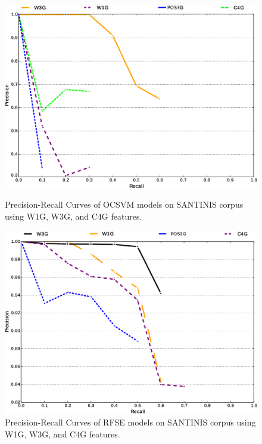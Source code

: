 \begin{figure}[t]
	\begin{center}
    \includegraphics[scale=0.45]{Figures/OCSME_Best_per_DocRep.eps}
	\caption{Precision-Recall Curves of OCSVM models on SANTINIS corpus using W1G, W3G, and C4G features.}
	\label{chap:noise:fig:MacroPRC_OCSVME_W3G_W1G_C4G_OPTIMAL_SANTINIS}
	\end{center}

	\begin{center}
    \includegraphics[scale=0.45]{Figures/RFSE_Best_per_DocRep.eps}
	\caption{Precision-Recall Curves of RFSE models on SANTINIS corpus using W1G, W3G, and C4G features.}
	\label{chap:noise:fig:MacroPRC_RFSE_W3G_W1G_C4G_OPTIMAL_SANTINIS}
	\end{center}
\end{figure}

